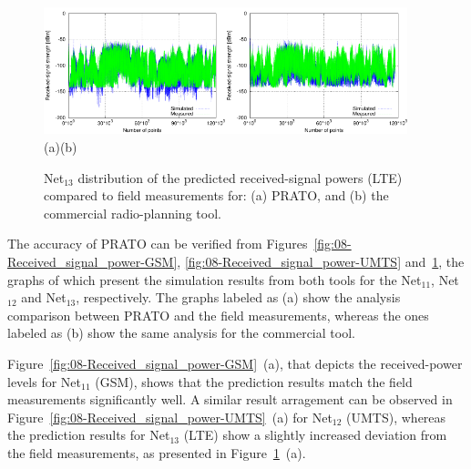 \begin{figure}[h]
\centering

\includegraphics[width=0.47\textwidth]{08-real_network_planning/img/lte_prato_rcv_pwr}\includegraphics[width=0.47\textwidth]{08-real_network_planning/img/lte_tcpu_rcv_pwr}\\\hspace{0.4cm}(a)\hspace{6.7cm}(b)

\caption{Net$_{13}$ distribution of the predicted received-signal powers (LTE)
compared to field measurements for: (a) PRATO, and (b) the commercial
radio-planning tool.\label{fig:08-Received_signal_power-LTE}}
\end{figure}


The accuracy of PRATO can be verified from Figures~\ref{fig:08-Received_signal_power-GSM},
\ref{fig:08-Received_signal_power-UMTS} and~\ref{fig:08-Received_signal_power-LTE},
the graphs of which present the simulation results from both tools
for the Net$_{11}$, Net$_{12}$ and Net$_{13}$, respectively. The
graphs labeled as (a) show the analysis comparison between PRATO and
the field measurements, whereas the ones labeled as (b) show the same
analysis for the commercial tool.

Figure~\ref{fig:08-Received_signal_power-GSM}~(a), that depicts
the received-power levels for Net$_{11}$ (GSM), shows that the prediction
results match the field measurements significantly well. A similar
result arragement can be observed in Figure~\ref{fig:08-Received_signal_power-UMTS}~(a)
for Net$_{12}$ (UMTS), whereas the prediction results for Net$_{13}$
(LTE) show a slightly increased deviation from the field measurements,
as presented in Figure~\ref{fig:08-Received_signal_power-LTE}~(a).

